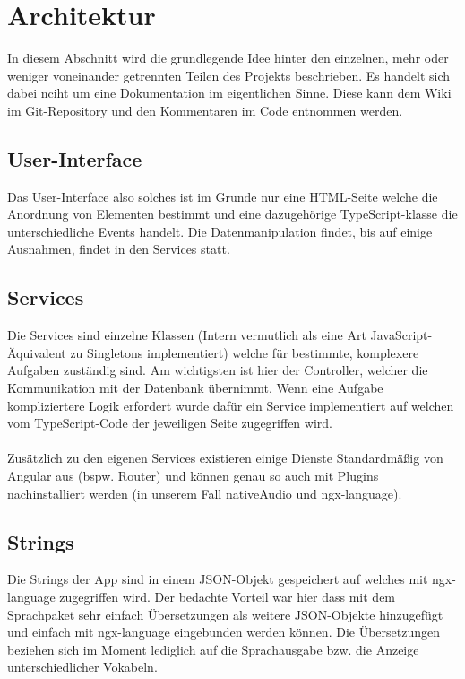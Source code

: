 
\section{Architektur}
In diesem Abschnitt wird die grundlegende Idee hinter den einzelnen, mehr oder weniger voneinander getrennten Teilen des Projekts beschrieben. Es handelt sich dabei nciht um eine Dokumentation im eigentlichen Sinne. Diese kann dem Wiki im Git-Repository und den Kommentaren im Code entnommen werden.

\subsection{User-Interface}
Das User-Interface also solches ist im Grunde nur eine HTML-Seite welche die Anordnung von Elementen bestimmt und eine dazugehörige TypeScript-klasse die unterschiedliche Events handelt. Die Datenmanipulation findet, bis auf einige Ausnahmen, findet in den Services statt. 

\subsection{Services}
Die Services sind einzelne Klassen (Intern vermutlich als eine Art JavaScript-Äquivalent zu Singletons implementiert) welche für bestimmte, komplexere Aufgaben zuständig sind. Am wichtigsten ist hier der Controller, welcher die Kommunikation mit der Datenbank übernimmt. Wenn eine Aufgabe kompliziertere Logik erfordert wurde dafür ein Service implementiert auf welchen vom TypeScript-Code der jeweiligen Seite zugegriffen wird.\\\\Zusätzlich zu den eigenen Services existieren einige Dienste Standardmäßig von Angular aus (bspw. Router) und können genau so auch mit Plugins nachinstalliert werden (in unserem Fall nativeAudio und ngx-language).

\subsection{Strings}
Die Strings der App sind in einem JSON-Objekt gespeichert auf welches mit ngx-language zugegriffen wird. Der bedachte Vorteil war hier dass mit dem Sprachpaket sehr einfach Übersetzungen als weitere JSON-Objekte hinzugefügt und einfach mit ngx-language eingebunden werden können. Die Übersetzungen beziehen sich im Moment lediglich auf die Sprachausgabe bzw. die Anzeige unterschiedlicher Vokabeln.

